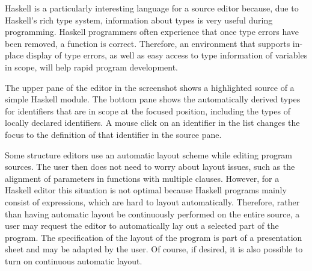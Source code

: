\documentclass{speauth}
\begin{document}
Haskell is a particularly interesting language for a source editor because, due to Haskell's rich type system, information about types is very useful during programming. Haskell programmers often experience that once type errors have been removed, a function is correct. Therefore, an environment that supports in-place display of type errors, as well as easy access to type information of variables in scope, will help rapid program development. 

The upper pane of the editor in the screenshot shows a highlighted source of a simple Haskell module. The bottom pane shows the automatically derived types for identifiers that are in scope at the focused position, including the types of locally declared identifiers. A mouse click on an identifier in the list changes the focus to the definition of that identifier in the source pane. 



Some structure editors use an automatic layout scheme while editing program sources. The user then does not need to worry about layout issues, such as the alignment of parameters in functions with multiple clauses. However, for a Haskell editor this situation is not optimal because Haskell programs mainly consist of expressions, which are hard to layout automatically. Therefore, rather than having automatic layout be continuously performed on the entire source, a user may request the editor to automatically lay out a selected part of the program. The specification of the layout of the program is part of a presentation sheet and may be adapted by the user. Of course, if desired, it is also possible to turn on continuous automatic layout.
\vspace{1em}


\newcommand{\editScreenshotTrns}[3]{%
\noindent
\begin{center}
\begin{picture}(400,155)(0,0)
\begin{scriptsize}
\put(0,30){ \framebox(185,125){#1}}
\put(215,30){ \framebox(185,125){#2}}
\end{scriptsize}
\put(195,90){ $\Rightarrow$}
\put(0,0) { \makebox(400,30){\centering #3 }}
\end{picture}
\end{center}
}
\end{document}
